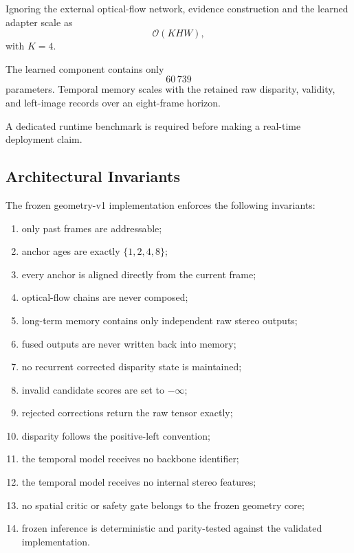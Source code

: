 \documentclass[11pt,a4paper]{article}
\begin{document}
Ignoring the external optical-flow network, evidence construction and the
learned adapter scale as
%
\begin{equation}
\mathcal{O}(KHW),
\end{equation}
%
with \(K=4\).

The learned component contains only
%
\begin{equation}
60\,739
\end{equation}
%
parameters. Temporal memory scales with the retained raw disparity,
validity, and left-image records over an eight-frame horizon.

A dedicated runtime benchmark is required before making a real-time
deployment claim.

\subsection{Architectural Invariants}
\label{sec:invariants}

The frozen geometry-v1 implementation enforces the following invariants:

\begin{enumerate}
    \item only past frames are addressable;
    \item anchor ages are exactly \(\{1,2,4,8\}\);
    \item every anchor is aligned directly from the current frame;
    \item optical-flow chains are never composed;
    \item long-term memory contains only independent raw stereo outputs;
    \item fused outputs are never written back into memory;
    \item no recurrent corrected disparity state is maintained;
    \item invalid candidate scores are set to \(-\infty\);
    \item rejected corrections return the raw tensor exactly;
    \item disparity follows the positive-left convention;
    \item the temporal model receives no backbone identifier;
    \item the temporal model receives no internal stereo features;
    \item no spatial critic or safety gate belongs to the frozen geometry
    core;
    \item frozen inference is deterministic and parity-tested against the
    validated implementation.
\end{enumerate}
\end{document}
